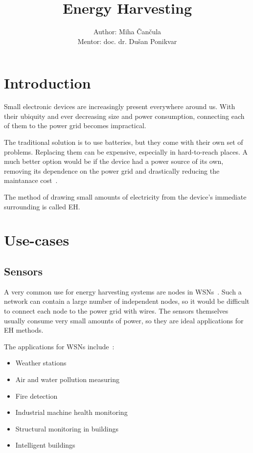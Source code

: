 \documentclass[a4paper,10pt]{article}
\title{Energy Harvesting}
\author{Author: Miha \v Can\v cula \\ Mentor: doc. dr. Du\v san Ponikvar}
\begin{document}
\maketitle

\begin{abstract}

\end{abstract}

\tableofcontents

\section{Introduction}

Small electronic devices are increasingly present everywhere around us. With their ubiquity and ever decreasing size and power consumption, connecting each of them to the power grid becomes impractical. 

The traditional solution is to use batteries, but they come with their own set of problems. Replacing them can be expensive, especially in hard-to-reach places. A much better option would be if the device had a power source of its own, removing its dependence on the power grid and drastically reducing the maintanace cost~\cite{Burgoine11}. 

The method of drawing small amounts of electricity from the device's immediate surrounding is called \ac{EH}. 

\section{Use-cases}

\subsection{Sensors}

A very common use for energy harvesting systems are nodes in \acp{WSN}~\cite{teg-wsn-ieee,cap-wsn-ieee}. Such a network can contain a large number of independent nodes, so it would be difficult to connect each node to the power grid with wires. The sensors themselves usually consume very small amounts of power, so they are ideal applications for \acl{EH} methods. 

The applications for \acp{WSN} include~\cite{wiki:eh}:
\begin{itemize}
  \item Weather stations
  \item Air and water pollution measuring
  \item Fire detection
  \item Industrial machine health monitoring
  \item Structural monitoring in buildings
  \item Intelligent buildings~\cite{cap-wsn-ieee}
\end{itemize}
\end{document}
